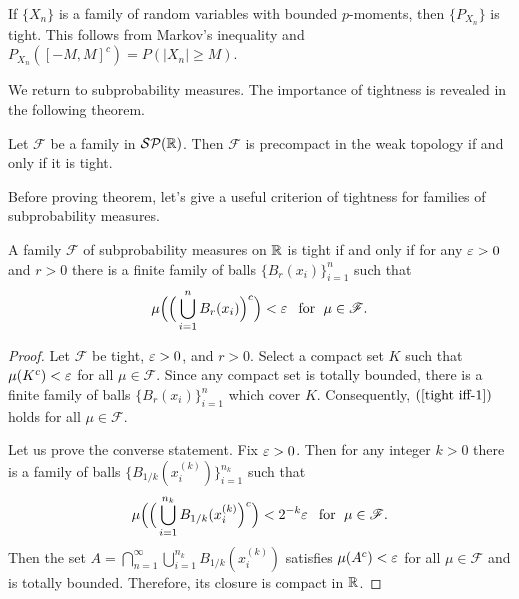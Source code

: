 \begin{example}
If $\{X_n\}$ is a family of random variables with bounded $p$-moments, then $\{P_{X_n}\}$ is tight. This follows from Markov's inequality and $P_{X_n}([-M,M]^c)=P(|X_n|\geq M)$.
\end{example}
We return to subprobability measures. The importance of tightness is revealed in the following theorem.
\begin{theorem}\label{Prokhorov theorem}
Let $\mathscr{F}$ be a family in $\mathcal{SP}(\mathbb{R})$. Then $\mathscr{F}$ is precompact in the weak topology if and only if it is tight.
\end{theorem}
Before proving theorem, let's give a useful criterion of tightness for families of subprobability measures.
\begin{lemma}\label{tight iff}
A family $\mathscr{F}$ of subprobability measures on $\mathbb{R}$ is tight if and only if for any $\varepsilon>0$ and $r>0$ there is a finite family of balls $\{B_r(x_i)\}_{i=1}^{n}$ such that
\begin{align}\label{tight iff-1}
\mu\Big(\Big(\bigcup_{i=1}^{n}B_r(x_i)\Big)^c\Big)<\varepsilon\hspace{8pt}\text{for}\hspace{6pt}\mu\in\mathscr{F}.
\end{align}
\end{lemma}
\begin{proof}
Let $\mathscr{F}$ be tight, $\varepsilon>0$, and $r>0$. Select a compact set $K$ such that $\mu(K^c)<\varepsilon$ for all $\mu\in\mathscr{F}$. Since any compact set is totally bounded, there is a finite family of balls $\{B_r(x_i)\}_{i=1}^{n}$ which cover $K$. Consequently, $(\ref{tight iff-1})$ holds for all $\mu\in\mathscr{F}$.\par
Let us prove the converse statement. Fix $\varepsilon>0$. Then for any integer $k>0$ there is a family of balls $\{B_{1/k}(x_i^{(k)})\}_{i=1}^{n_k}$ such that
\[\mu\Big(\Big(\bigcup_{i=1}^{n_k}B_{1/k}(x_i^{(k)}\Big)^c\Big)<2^{-k}\varepsilon\hspace{8pt}\text{for}\hspace{6pt}\mu\in\mathscr{F}.\]
Then the set $A=\bigcap_{n=1}^{\infty}\bigcup_{i=1}^{n_k}B_{1/k}(x_i^{(k)})$ satisfies $\mu(A^c)<\varepsilon$ for all $\mu\in\mathscr{F}$ and is totally bounded. Therefore, its closure is compact in $\mathbb{R}$.
\end{proof}
